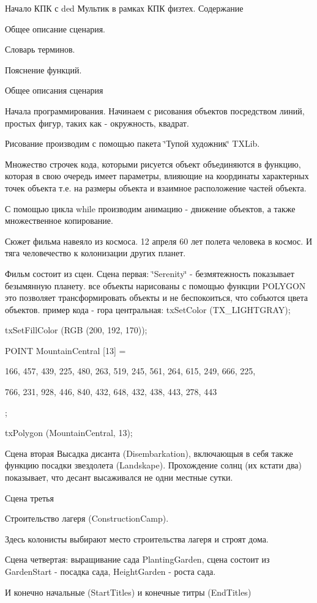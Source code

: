 Начало КПК с ded Мультик в рамках КПК физтех. 
 Содержание


\begin{DoxyEnumerate}
\item Общее описание сценария.
\item Словарь терминов.
\item Пояснение функций. 

\end{DoxyEnumerate}
\begin{DoxyEnumerate}
\item Общее описания сценария
\end{DoxyEnumerate}

Начала программирования. Начинаем с рисования объектов посредством линий, простых фигур, таких как -\/ окружность, квадрат.

Рисование производим с помощью пакета \char`\"{}Тупой художник\char`\"{} TXLib.

Множество строчек кода, которыми рисуется объект объединяются в функцию, которая в свою очередь имеет параметры, влияющие на координаты характерных точек объекта т.\+е. на размеры объекта и взаимное расположение частей объекта.

С помощью цикла while производим анимацию -\/ движение объектов, а также множественное копирование.

Сюжет фильма навеяло из космоса. 12 апреля 60 лет полета человека в космос. И тяга человечество к колонизации других планет.

Фильм состоит из сцен. Сцена первая\+: \char`\"{}\+Serenity\char`\"{} -\/ безмятежность показывает безымянную планету. все объекты нарисованы с помощью функции POLYGON это позволяет трансформировать объекты и не беспокоиться, что собъются цвета объектов. пример кода -\/ гора центральная\+: 
 tx\+Set\+Color (TX\+\_\+\+LIGHTGRAY); \begin{DoxyVerb}txSetFillColor (RGB (200, 192, 170));

POINT MountainCentral [13] = {{166, 457}, {439, 225}, {480, 263}, {519, 245}, {561, 264}, {615, 249}, {666, 225},

                              {766, 231}, {928, 446}, {840, 432}, {648, 432}, {438, 443}, {278, 443}};

txPolygon (MountainCentral, 13);
\end{DoxyVerb}




Сцена вторая Высадка дисанта (Disembarkation), включающыя в себя также функцию посадки звездолета (Landskape). Прохождение солнц (их кстати два) показывает, что десант высаживался не одни местные сутки.



Сцена третья

Строительство лагеря (Construction\+Camp).

Здесь колонисты выбирают место строительства лагеря и строят дома.

Сцена четвертая\+: выращивание сада Planting\+Garden, сцена состоит из Garden\+Start -\/ посадка сада, Height\+Garden -\/ роста сада.

И конечно начальные (Start\+Titles) и конечные титры (End\+Titles)

 